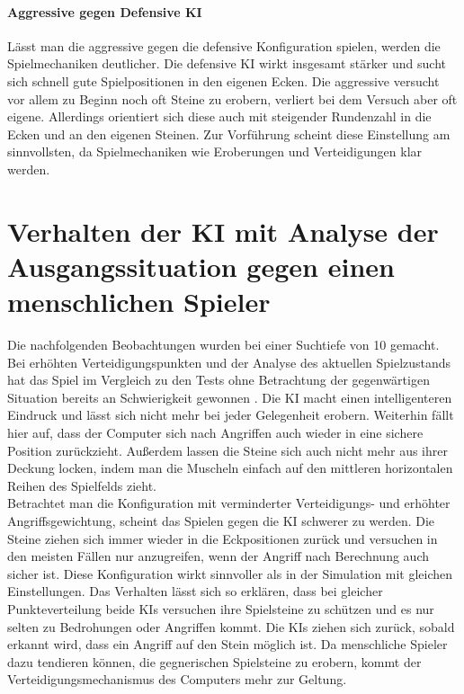\paragraph{Aggressive gegen Defensive KI}
Lässt man die aggressive gegen die defensive Konfiguration spielen, werden die Spielmechaniken deutlicher. Die defensive KI wirkt insgesamt stärker und sucht sich schnell gute Spielpositionen in den eigenen Ecken. Die aggressive versucht vor allem zu Beginn noch oft Steine zu erobern, verliert bei dem Versuch aber oft eigene. Allerdings orientiert sich diese auch mit steigender Rundenzahl in die Ecken und an den eigenen Steinen. Zur Vorführung scheint diese Einstellung am sinnvollsten, da Spielmechaniken wie Eroberungen und Verteidigungen klar werden. 
\section{Verhalten der KI mit Analyse der Ausgangssituation gegen einen menschlichen Spieler}
\label{ch:Evaluierung:sec:KIvsHumanWithAnalyse}
Die nachfolgenden Beobachtungen wurden bei einer Suchtiefe von 10 gemacht. Bei erhöhten Verteidigungspunkten und der Analyse des aktuellen Spielzustands hat das Spiel im Vergleich zu den Tests ohne Betrachtung der gegenwärtigen Situation bereits an Schwierigkeit gewonnen . Die KI macht einen intelligenteren Eindruck und lässt sich nicht mehr bei jeder Gelegenheit erobern. Weiterhin fällt hier auf, dass der Computer sich nach Angriffen auch wieder in eine sichere Position zurückzieht. Außerdem lassen die Steine sich auch nicht mehr aus ihrer Deckung locken, indem man die Muscheln einfach auf den mittleren horizontalen Reihen des Spielfelds zieht.\\
Betrachtet man die Konfiguration mit verminderter Verteidigungs- und erhöhter Angriffsgewichtung, scheint das Spielen gegen die KI schwerer zu werden. Die Steine ziehen sich immer wieder in die Eckpositionen zurück und versuchen in den meisten Fällen nur anzugreifen, wenn der Angriff nach Berechnung auch sicher ist. Diese Konfiguration wirkt sinnvoller als in der Simulation mit gleichen Einstellungen. Das Verhalten lässt sich so erklären, dass bei gleicher Punkteverteilung beide KIs versuchen ihre Spielsteine zu schützen und es nur selten zu Bedrohungen oder Angriffen kommt. Die KIs ziehen sich zurück, sobald erkannt wird, dass ein Angriff auf den Stein möglich ist. Da menschliche Spieler dazu tendieren können, die gegnerischen Spielsteine zu erobern, kommt der Verteidigungsmechanismus des Computers mehr zur Geltung.

